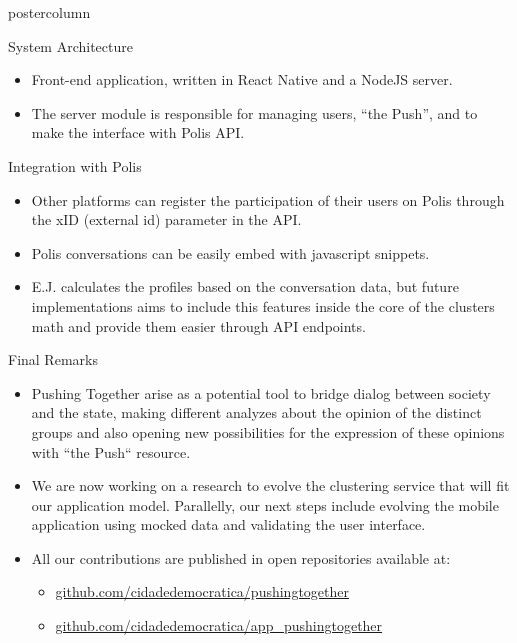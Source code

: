 \documentclass[final,hyperref={pdfpagelabels=false}]{beamer}
\begin{document}
\begin{frame}
\begin{columns}
\begin{column}{.49\textwidth}
\begin{beamercolorbox}[center,wd=\textwidth]{postercolumn}
\begin{minipage}[T]{.95\textwidth}
{\begin{block}{System Architecture}
	\begin{itemize}
    \item Front-end application, written in React Native
    and a NodeJS server.

    \item The server module is responsible for managing users, ``the Push'', and
    to make the interface with Polis API.
  \end{itemize}

\end{block}

\begin{block}{Integration with Polis}
  \begin{itemize}
    \item Other platforms can register the participation of their users on Polis
    through the xID (external id) parameter in the API.

    \item Polis conversations can be easily embed with javascript snippets.

    \item E.J. calculates the profiles based on the conversation data, but future
    implementations aims to include this features inside the core of the clusters
    math and provide them easier through API endpoints.
  \end{itemize}
\end{block}

\begin{block}{Final Remarks}
  \begin{itemize}
    \item Pushing Together arise as a potential tool to bridge dialog between society and
    the state, making different analyzes about the opinion of the distinct groups
    and also opening new possibilities for the expression of these opinions with ``the
    Push`` resource.

    \item We are now working on a research to evolve the clustering service that
    will fit our application model. Parallelly, our next steps include evolving the
    mobile application using mocked data and validating the user interface.

    \item All our contributions are published in open repositories available at:
      \begin{itemize}
        \item \url{github.com/cidadedemocratica/pushingtogether}
        \item \url{github.com/cidadedemocratica/app_pushingtogether}
      \end{itemize}
  \end{itemize}
\end{block}
      }
        \end{minipage}
      \end{beamercolorbox}
    \end{column}
  \end{columns}
\end{frame}
\end{document}
